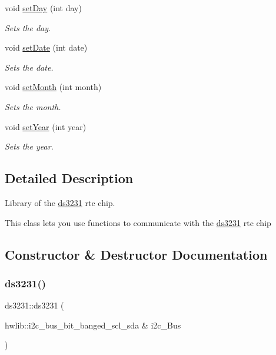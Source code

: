 \begin{DoxyCompactItemize}
void \hyperlink{classds3231_ad886fbf5b85fad7eeb44fc3be689535a}{set\+Day} (int day)
\begin{DoxyCompactList}\small\item\em Sets the day. \end{DoxyCompactList}\item 
void \hyperlink{classds3231_a9594709f7a4853878efe80f27084e199}{set\+Date} (int date)
\begin{DoxyCompactList}\small\item\em Sets the date. \end{DoxyCompactList}\item 
void \hyperlink{classds3231_a535002d35845c9435010a78f5f5eed5e}{set\+Month} (int month)
\begin{DoxyCompactList}\small\item\em Sets the month. \end{DoxyCompactList}\item 
void \hyperlink{classds3231_a2fde2f14ed58c3fa990f512beae14611}{set\+Year} (int year)
\begin{DoxyCompactList}\small\item\em Sets the year. \end{DoxyCompactList}\end{DoxyCompactItemize}


\subsection{Detailed Description}
Library of the \hyperlink{classds3231}{ds3231} rtc chip. 

This class lets you use functions to communicate with the \hyperlink{classds3231}{ds3231} rtc chip 

\subsection{Constructor \& Destructor Documentation}
\mbox{\label{classds3231_acdd3a6b3ea33bb72460fcc89ea5ef3e9}} 
\subsubsection{\texorpdfstring{ds3231()}{ds3231()}}
{\footnotesize\ttfamily ds3231\+::ds3231 (\begin{DoxyParamCaption}\item[{hwlib\+::i2c\+\_\+bus\+\_\+bit\+\_\+banged\+\_\+scl\+\_\+sda \&}]{i2c\+\_\+\+Bus }\end{DoxyParamCaption})\hspace{0.3cm}{\ttfamily [inline]}}



